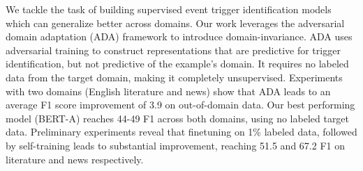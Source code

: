 We tackle the task of building supervised event trigger identification models which can generalize better across domains. Our work leverages the adversarial domain adaptation (ADA) framework to introduce domain-invariance. ADA uses adversarial training to construct representations that are predictive for trigger identification, but not predictive of the example's domain. It requires no labeled data from the target domain, making it completely unsupervised. Experiments with two domains (English literature and news) show that ADA leads to an average F1 score improvement of 3.9 on out-of-domain data. Our best performing model (BERT-A) reaches 44-49 F1 across both domains, using no labeled target data. Preliminary experiments reveal that finetuning on 1\% labeled data, followed by self-training leads to substantial improvement, reaching 51.5 and 67.2 F1 on literature and news respectively.
